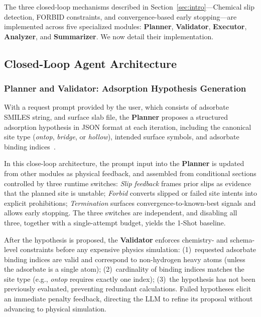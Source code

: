 The three closed-loop mechanisms described in Section~\ref{sec:intro}---Chemical slip detection, FORBID constraints, and convergence-based early stopping---are implemented across five specialized modules: \textbf{Planner}, \textbf{Validator}, \textbf{Executor}, \textbf{Analyzer}, and \textbf{Summarizer}. We now detail their implementation.

\subsection{Closed-Loop Agent Architecture}

\subsubsection{Planner and Validator: Adsorption Hypothesis Generation}

With a request prompt provided by the user, which consists of adsorbate SMILES string, and surface slab file, the \textbf{Planner} proposes a structured adsorption hypothesis in JSON format at each iteration, including the canonical site type (\textit{ontop}, \textit{bridge}, or \textit{hollow}), intended surface symbols, and adsorbate binding indices~\cite{norskov2011density}.

In this close-loop architecture, the prompt input into the \textbf{Planner} is updated from other modules as physical feedback, and assembled from conditional sections controlled by three runtime switches:
\textit{Slip feedback} frames prior slips as evidence that the planned site is unstable;
\textit{Forbid} converts slipped or failed site intents into explicit prohibitions;
\textit{Termination} surfaces convergence-to-known-best signals and allows early stopping.
The three switches are independent, and disabling all three, together with a single-attempt budget, yields the 1-Shot baseline.

After the hypothesis is proposed, the \textbf{Validator} enforces chemistry- and schema-level constraints before any expensive physics simulation:
(1)~requested adsorbate binding indices are valid and correspond to non-hydrogen heavy atoms (unless the adsorbate is a single atom);
(2)~cardinality of binding indices matches the site type (e.g., \textit{ontop} requires exactly one index);
(3)~the hypothesis has not been previously evaluated, preventing redundant calculations.
Failed hypotheses elicit an immediate penalty feedback, directing the LLM to refine its proposal without advancing to physical simulation.

